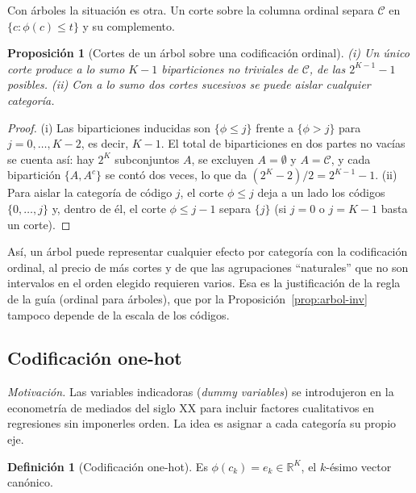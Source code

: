 \documentclass[11pt]{article}
\newtheorem{proposicion}[teorema]{Proposición}
\theoremstyle{definition}
\newtheorem{definicion}[teorema]{Definición}
\theoremstyle{remark}
\newcommand{\R}{\mathbb{R}}
\begin{document}
\medskip

\noindent Con árboles la situación es otra. Un corte sobre la columna ordinal separa $\mathcal{C}$ en $\{c:\phi(c)\le t\}$ y su complemento.

\begin{proposicion}[Cortes de un árbol sobre una codificación ordinal]\label{prop:ordinal-arbol}
\noindent (i) Un único corte produce a lo sumo $K-1$ biparticiones no triviales de $\mathcal{C}$, de las $2^{K-1}-1$ posibles. (ii) Con a lo sumo dos cortes sucesivos se puede aislar cualquier categoría.
\end{proposicion}
\begin{proof}
\noindent (i) Las biparticiones inducidas son $\{\phi\le j\}$ frente a $\{\phi>j\}$ para $j=0,\dots,K-2$, es decir, $K-1$. El total de biparticiones en dos partes no vacías se cuenta así: hay $2^K$ subconjuntos $A$, se excluyen $A=\emptyset$ y $A=\mathcal{C}$, y cada bipartición $\{A,A^c\}$ se contó dos veces, lo que da $(2^K-2)/2=2^{K-1}-1$. (ii) Para aislar la categoría de código $j$, el corte $\phi\le j$ deja a un lado los códigos $\{0,\dots,j\}$ y, dentro de él, el corte $\phi\le j-1$ separa $\{j\}$ (si $j=0$ o $j=K-1$ basta un corte).
\end{proof}

\noindent Así, un árbol puede representar cualquier efecto por categoría con la codificación ordinal, al precio de más cortes y de que las agrupaciones ``naturales'' que no son intervalos en el orden elegido requieren varios. Esa es la justificación de la regla de la guía (ordinal para árboles), que por la Proposición~\ref{prop:arbol-inv} tampoco depende de la escala de los códigos.

\subsection{Codificación one-hot}\label{sec:onehot}

\noindent \emph{Motivación.} Las variables indicadoras (\emph{dummy variables}) se introdujeron en la econometría de mediados del siglo XX para incluir factores cualitativos en regresiones sin imponerles orden. La idea es asignar a cada categoría su propio eje.

\begin{definicion}[Codificación one-hot]\label{def:onehot}
\noindent Es $\phi(c_k)=e_k\in\R^K$, el $k$-ésimo vector canónico.
\end{definicion}
\end{document}
